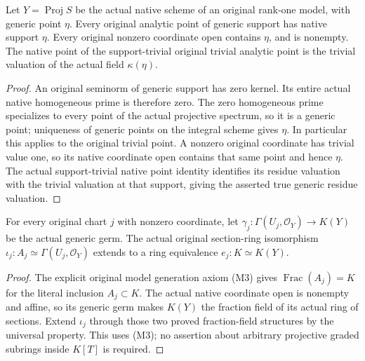 \begin{lemma}
\label{lem:seven-native-original-generic-point}
\leanok
Let $Y=\operatorname{Proj}S$ be the actual native scheme of an original
rank-one model, with generic point $\eta$. Every original analytic point of
generic support has native support $\eta$. Every original nonzero coordinate
open contains $\eta$, and is nonempty. The native point of the support-trivial
original trivial analytic point is the trivial valuation of the actual field
$\kappa(\eta)$.
\end{lemma}
\begin{proof}
An original seminorm of generic support has zero kernel. Its entire actual
native homogeneous prime is therefore zero. The zero homogeneous prime
specializes to every point of the actual projective spectrum, so it is a
generic point; uniqueness of generic points on the integral scheme gives
$\eta$. In particular this applies to the original trivial point. A nonzero
original coordinate has trivial value one, so its native coordinate open
contains that same point and hence $\eta$. The actual support-trivial native
point identity identifies its residue valuation with the trivial valuation
at that support, giving the asserted true generic residue valuation.
\end{proof}

\begin{definition}
\label{def:seven-native-original-field-equivalence}
\leanok
For every original chart $j$ with nonzero coordinate, let
$\gamma_j:\Gamma(U_j,\mathcal O_Y)\to K(Y)$ be the actual generic germ.
The actual original section-ring isomorphism
$\iota_j:A_j\simeq\Gamma(U_j,\mathcal O_Y)$ extends to a ring equivalence
$e_j:K\simeq K(Y)$.
\end{definition}
\begin{proof}
The explicit original model generation axiom (M3) gives
$\operatorname{Frac}(A_j)=K$ for the literal inclusion $A_j\subset K$.
The actual native coordinate open is nonempty and affine, so its generic
germ makes $K(Y)$ the fraction field of its actual ring of sections.
Extend $\iota_j$ through those two proved fraction-field structures by the
universal property. This uses (M3); no assertion about arbitrary projective
graded subrings inside $K[T]$ is required.
\end{proof}

